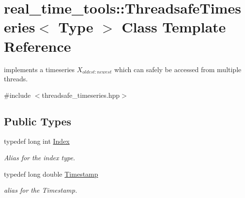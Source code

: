\hypertarget{classreal__time__tools_1_1ThreadsafeTimeseries}{}\section{real\+\_\+time\+\_\+tools\+:\+:Threadsafe\+Timeseries$<$ Type $>$ Class Template Reference}
\label{classreal__time__tools_1_1ThreadsafeTimeseries}


implements a timeseries $ X_{{oldest}:{newest}} $ which can safely be accessed from multiple threads.  




{\ttfamily \#include $<$threadsafe\+\_\+timeseries.\+hpp$>$}

\subsection*{Public Types}
\begin{DoxyCompactItemize}
\item 
\mbox{\label{classreal__time__tools_1_1ThreadsafeTimeseries_a9364696c534468d7ad927883b16ca981}} 
typedef long int \hyperlink{classreal__time__tools_1_1ThreadsafeTimeseries_a9364696c534468d7ad927883b16ca981}{Index}
\begin{DoxyCompactList}\small\item\em Alias for the index type. \end{DoxyCompactList}\item 
\mbox{\label{classreal__time__tools_1_1ThreadsafeTimeseries_a41e36f99889a580ce56491e573fa77b0}} 
typedef long double \hyperlink{classreal__time__tools_1_1ThreadsafeTimeseries_a41e36f99889a580ce56491e573fa77b0}{Timestamp}
\begin{DoxyCompactList}\small\item\em alias for the Timestamp. \end{DoxyCompactList}\end{DoxyCompactItemize}
